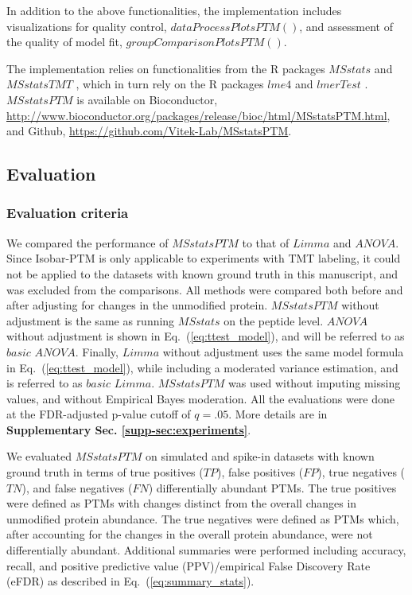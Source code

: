 \documentclass[mcp]{article}
\numberwithin{table}{section}
\def\eqref#1{Eq.~(\ref{eq:#1})}
\begin{document}
In addition to the above functionalities, the implementation includes visualizations for quality control, $dataProcessPlotsPTM()$, and assessment of the quality of model fit, $groupComparisonPlotsPTM()$.

The implementation relies on functionalities from the R packages $MSstats$ \cite{Choi:2014} and $MSstatsTMT$ \cite{Huang:2020}, which in turn rely on the R packages $lme4$ \cite{Bates2015} and $lmerTest$ \cite{Kuznetsova2017}. $MSstatsPTM$ is available on Bioconductor, \url{http://www.bioconductor.org/packages/release/bioc/html/MSstatsPTM.html}, and Github, \url{https://github.com/Vitek-Lab/MSstatsPTM}.

\subsection*{Evaluation}

\subsubsection*{Evaluation criteria}

We compared the performance of $MSstatsPTM$ to that of $Limma$ and $ANOVA$. Since Isobar-PTM is only applicable to experiments with TMT labeling, it could not be applied to the datasets with known ground truth in this manuscript, and was excluded from the comparisons. All methods were compared both before and after adjusting for changes in the unmodified protein. $MSstatsPTM$ without adjustment is the same as running $MSstats$ on the peptide level. $ANOVA$ without adjustment is shown in \eqref{ttest_model}, and will be referred to as $basic$ $ANOVA$. Finally, $Limma$ without adjustment uses the same model formula in \eqref{ttest_model}, while including a moderated variance estimation, and is referred to as $basic$ $Limma$. $MSstatsPTM$ was used without imputing missing values, and without Empirical Bayes moderation. All the evaluations were done at the FDR-adjusted p-value cutoff of $q=.05$. More details are in {\bf Supplementary Sec. \ref{supp-sec:experiments}}. 

We evaluated $MSstatsPTM$ on simulated and spike-in datasets with known ground truth in terms of true positives ($TP$), false positives ($FP$), true negatives ($TN$), and false negatives ($FN$) differentially abundant PTMs. The true positives were defined as PTMs with changes distinct from the overall changes in unmodified protein abundance. The true negatives were defined as PTMs which, after accounting for the changes in the overall protein abundance, were not differentially abundant. Additional summaries were performed including accuracy, recall, and positive predictive value (PPV)/empirical False Discovery Rate (eFDR) as described in \eqref{summary_stats}. 
\end{document}
